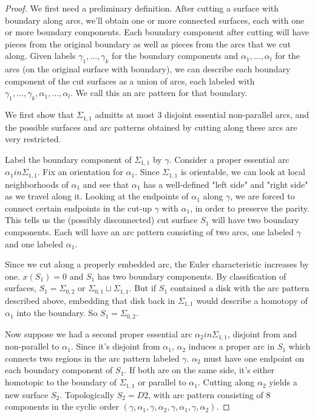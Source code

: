 \documentclass[12pt]{amsart}
\theoremstyle{definition}
\newcommand{\Si}{\Sigma}
\begin{document}
\begin{proof}

We first need a preliminary definition. After cutting a surface with
boundary along arcs, we'll obtain one or more connected surfaces, each with one
or more boundary components. Each boundary component after cutting will have
pieces from the original boundary as well as pieces from the arcs that we cut
along. Given labels $\gamma_1,...,\gamma_k$ for the boundary components and
$\alpha_1,...,\alpha_l$ for the arcs (on the original surface with boundary), we can
describe each boundary component of the cut surfaces as a union of arcs, each
labeled with $\gamma_1,...,\gamma_k,\alpha_1,...,\alpha_l$. We call this an arc pattern
for that boundary.

We first show that $\Si_{1,1}$ admitts at most 3 disjoint essential non-parallel arcs,
and the possible surfaces and arc patterns obtained by cutting along these arcs
are very restricted.

Label the boundary component of $\Si_{1,1}$ by $\gamma$. Consider a proper essential arc
$\alpha_1 in \Si_{1,1}$. Fix an orientation for $\alpha_1$. Since $\Si_{1,1}$ is orientable, we can
look at local neighborhoods of $\alpha_1$ and see that $\alpha_1$ has a well-defined
"left side" and "right side" as we travel along it. Looking at the endpoints of
$\alpha_1$ along $\gamma$, we are forced to connect certain endpoints in the cut-up
$\gamma$ with $\alpha_1$, in order to preserve the parity. This tells us the (possibly
disconnected) cut surface $S_1$ will have two boundary components. Each will have
an arc pattern consisting of two arcs, one labeled $\gamma$ and one labeled
$\alpha_1$.

Since we cut along a properly embedded arc, the Euler characteristic increases
by one. $x(S_1)=0$ and $S_1$ has two boundary components. By classification of
surfaces, $S_1 = \Si_{0,2}$ or $\Si_{0,1} \sqcup \Si_{1,1}$. But if $S_1$ contained a disk with the arc
pattern described above, embedding that disk back in $\Si_{1,1}$ would describe
a homotopy of $\alpha_1$ into the boundary. So $S_1 = \Si_{0,2}$.

Now suppose we had a second proper essential arc $\alpha_2 in \Si_{1,1}$, disjoint from
and non-parallel to $\alpha_1$. Since it's disjoint from $\alpha_1$, $\alpha_2$ induces
a proper arc in $S_1$ which connects two regions in the arc pattern labeled
$\gamma$.
$\alpha_2$ must have one endpoint on each boundary component of $S_1$. If both are on
the same side, it's either homotopic to the boundary of $\Si_{1,1}$ or parallel to
$\alpha_1$. Cutting along $\alpha_2$ yields a new surface $S_2$. Topologically
$S_2=D2$, with
arc pattern consisting of 8 components in the cyclic order
$(\gamma,\alpha_1,\gamma,\alpha_2,\gamma,\alpha_1,\gamma,\alpha_2)$.


\end{proof}
\end{document}
